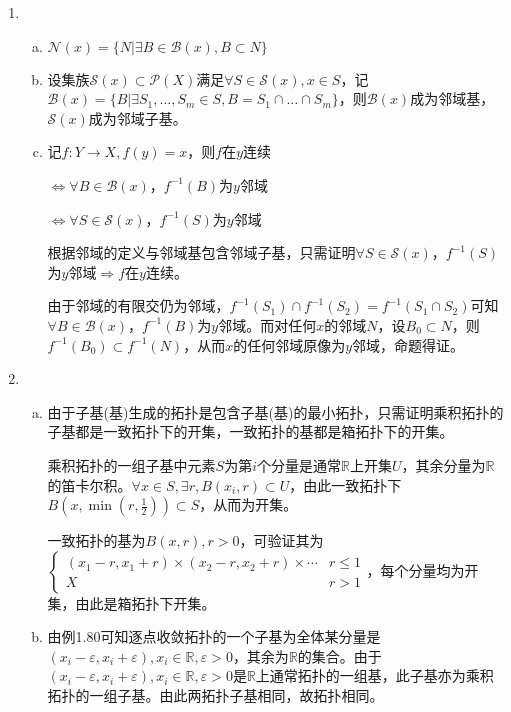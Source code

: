 \documentclass[a4paper,UTF8,fontset=windows]{ctexart}
\begin{document}
\begin{enumerate}[(1)]
    \item
    \begin{enumerate}[(a)]
    \item
    $\mathcal{N}(x)=\{N|\exists B\in\mathcal{B}(x),B\subset N\}$
    
    \item
    设集族$\mathcal{S}(x)\subset \mathcal{P}(X)$满足$\forall S\in\mathcal{S}(x), x\in S$，记$\mathcal{B}(x)=\{B|\exists S_1,\dots,S_m\in S,B=S_1\cap\dots\cap S_m\}$，则$\mathcal{B}(x)$成为邻域基，$\mathcal{S}(x)$成为邻域子基。
    
    \item
    记$f:Y\to X,f(y)=x$，则$f$在$y$连续
    
    $\Longleftrightarrow\forall B\in\mathcal{B}(x)$，$f^{-1}(B)$为$y$邻域
    
    $\Longleftrightarrow\forall S\in\mathcal{S}(x)$，$f^{-1}(S)$为$y$邻域
    
    根据邻域的定义与邻域基包含邻域子基，只需证明$\forall S\in\mathcal{S}(x)$，$f^{-1}(S)$为$y$邻域$\Longrightarrow f$在$y$连续。
    
    由于邻域的有限交仍为邻域，$f^{-1}(S_1)\cap f^{-1}(S_2)=f^{-1}(S_1\cap S_2)$可知$\forall B\in\mathcal{B}(x)$，$f^{-1}(B)$为$y$邻域。而对任何$x$的邻域$N$，设$B_0\subset N$，则$f^{-1}(B_0)\subset f^{-1}(N)$，从而$x$的任何邻域原像为$y$邻域，命题得证。
    \end{enumerate}
    
    \item
    \begin{enumerate}[(a)]
    \item
    由于子基(基)生成的拓扑是包含子基(基)的最小拓扑，只需证明乘积拓扑的子基都是一致拓扑下的开集，一致拓扑的基都是箱拓扑下的开集。
    
    乘积拓扑的一组子基中元素$S$为第$i$个分量是通常$\mathbb{R}$上开集$U$，其余分量为$\mathbb{R}$的笛卡尔积。$\forall x\in S,\exists r, B(x_i,r)\subset U$，由此一致拓扑下$B(x,\min(r,\frac{1}{2}))\subset S$，从而为开集。
    
    一致拓扑的基为$B(x,r),r>0$，可验证其为$\begin{cases}(x_1-r,x_1+r)\times(x_2-r,x_2+r)\times\cdots&r\le1\\X&r>1\end{cases}$，每个分量均为开集，由此是箱拓扑下开集。
    
    \item
    由例1.80可知逐点收敛拓扑的一个子基为全体某分量是$(x_i-\varepsilon,x_i+\varepsilon),x_i\in\mathbb{R},\varepsilon>0$，其余为$\mathbb{R}$的集合。由于$(x_i-\varepsilon,x_i+\varepsilon),x_i\in\mathbb{R},\varepsilon>0$是$\mathbb{R}$上通常拓扑的一组基，此子基亦为乘积拓扑的一组子基。由此两拓扑子基相同，故拓扑相同。
    

\end{enumerate}
\end{enumerate}
\end{document}
